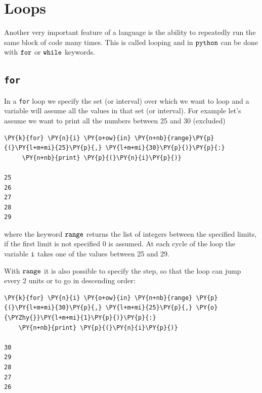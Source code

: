 \section{Loops}\label{loops}

Another very important feature of a language is the ability to repeatedly run the same 
block of code many times. This is called looping and in \(\tt{python}\) can be done
 with $\tt{for}$ or $\tt{while}$ keywords.

\subsection{\texttt{for}}\label{for}

In a \texttt{for} loop we specify the set (or interval) over which we want to loop and a 
variable will assume all the values in that set (or interval). For example let's assume we 
want to print all the numbers between 25 and 30 (excluded) 

\begin{tcolorbox}[breakable, size=fbox, boxrule=1pt, pad at break*=1mm, colback=cellbackground, colframe=cellborder]            
\begin{Verbatim}[commandchars=\\\{\}]
\PY{k}{for} \PY{n}{i} \PY{o+ow}{in} \PY{n+nb}{range}\PY{p}{(}\PY{l+m+mi}{25}\PY{p}{,} \PY{l+m+mi}{30}\PY{p}{)}\PY{p}{:}
     \PY{n+nb}{print} \PY{p}{(}\PY{n}{i}\PY{p}{)}

25
26
27
28
29
\end{Verbatim}
\end{tcolorbox}
\noindent
where the keyword $\tt{range}$ returns the list of integers between the specified limits, 
if the first limit is not specified 0 is assumed.
At each cycle of the loop the variable $\tt{i}$ takes one of the values between
25 and 29. 

With $\tt{range}$ it is also possible to specify the step, so that the loop can jump every 2 units or to go in descending order:

\begin{tcolorbox}[breakable, size=fbox, boxrule=1pt, pad at break*=1mm, colback=cellbackground, colframe=cellborder]            
\begin{Verbatim}[commandchars=\\\{\}]
\PY{k}{for} \PY{n}{i} \PY{o+ow}{in} \PY{n+nb}{range} \PY{p}{(}\PY{l+m+mi}{30}\PY{p}{,} \PY{l+m+mi}{25}\PY{p}{,} \PY{o}{\PYZhy{}}\PY{l+m+mi}{1}\PY{p}{)}\PY{p}{:}
    \PY{n+nb}{print} \PY{p}{(}\PY{n}{i}\PY{p}{)}

30
29
28
27
26
\end{Verbatim}
\end{tcolorbox}

